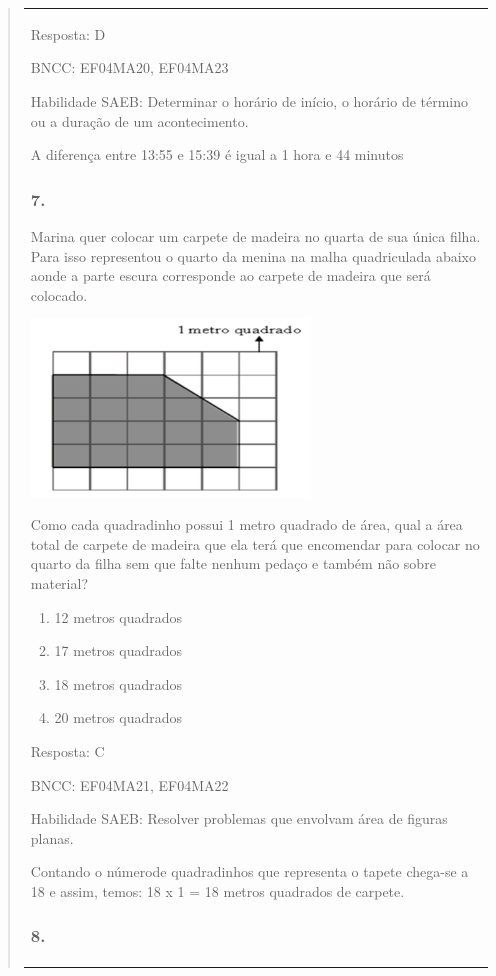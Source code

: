 \begin{enumerate}
\begin{escolha}
\begin{enumerate}
\begin{itemize}
\begin{itemize}
\begin{escolha}
\begin{quote}
\begin{escolha}
{\begin{longtable}[]{@{}l@{}}
\begin{itemize}
Resposta: D

BNCC: EF04MA20, EF04MA23

Habilidade SAEB: Determinar o horário de início, o horário de término ou
a duração de um acontecimento.

A diferença entre 13:55 e 15:39 é igual a 1 hora e 44 minutos

\subsubsection{7. }\label{section-178}

Marina quer colocar um carpete de madeira no quarta de sua única filha.
Para isso representou o quarto da menina na malha quadriculada abaixo
aonde a parte escura corresponde ao carpete de madeira que será
colocado.

\includegraphics[width=2.90385in,height=1.84662in]{media/image160.png}

Como cada quadradinho possui 1 metro quadrado de área, qual a área total
de carpete de madeira que ela terá que encomendar para colocar no quarto
da filha sem que falte nenhum pedaço e também não sobre material?

\begin{enumerate}
\def\labelenumi{\alph{enumi})}
\item
  12 metros quadrados
\item
  17 metros quadrados
\item
  18 metros quadrados
\item
  20 metros quadrados
\end{enumerate}

Resposta: C

BNCC: EF04MA21, EF04MA22

Habilidade SAEB: Resolver problemas que envolvam área de figuras planas.

Contando o númerode quadradinhos que representa o tapete chega-se a 18 e
assim, temos: 18 x 1 = 18 metros quadrados de carpete.

\subsubsection{8. }\label{section-179}


\end{itemize}
\end{longtable}}
\end{escolha}
\end{quote}
\end{escolha}
\end{itemize}
\end{itemize}
\end{enumerate}
\end{escolha}
\end{enumerate}
